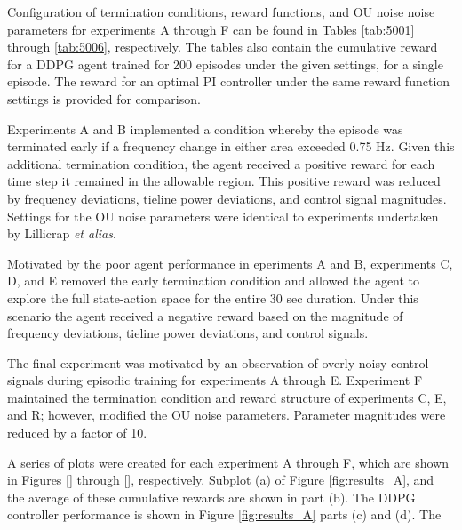 \newpage

Configuration of termination conditions, reward functions, and OU noise noise parameters for experiments A through F can be found in Tables \ref{tab:5001} through \ref{tab:5006}, respectively. The tables also contain the cumulative reward for a DDPG agent trained for 200 episodes under the given settings, for a single episode. The reward for an optimal PI controller under the same reward function settings is provided for comparison. 

Experiments A and B implemented a condition whereby the episode was terminated early if a frequency change in either area exceeded 0.75 Hz. Given this additional termination condition, the agent received a positive reward for each time step it remained in the allowable region. This positive reward was reduced by frequency deviations, tieline power deviations, and control signal magnitudes. Settings for the OU noise parameters were identical to experiments undertaken by Lillicrap \textit{et alias}.

Motivated by the poor agent performance in eperiments A and B, experiments C, D, and E removed the early termination condition and allowed the agent to explore the full state-action space for the entire 30 sec duration. Under this scenario the agent received a negative reward based on the magnitude of frequency deviations, tieline power deviations, and control signals.

The final experiment was motivated by an observation of overly noisy control signals during episodic training for experiments A through E. Experiment F maintained the termination condition and reward structure of experiments C, E, and R; however, modified the OU noise parameters. Parameter magnitudes were reduced by a factor of 10.

A series of plots were created for each experiment A through F, which are shown in Figures \ref{} through \ref{}, respectively. Subplot (a) of Figure \ref{fig:results_A}, and the average of these cumulative rewards are shown in part (b). The DDPG controller performance is shown in Figure \ref{fig:results_A} parts (c) and (d). The 









